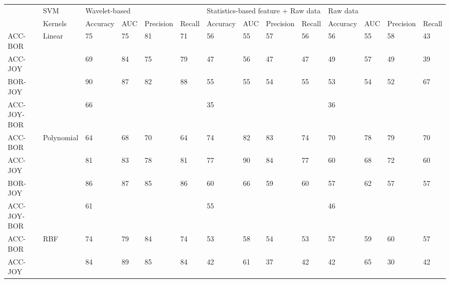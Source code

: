 \begin{sidewaystable}[]
{\begin{tabular}{llllllllllllll}
		\hline
		& SVM                            & \multicolumn{4}{l|}{Wavelet-based}   & \multicolumn{4}{l|}{Statistics-based feature + Raw data} & \multicolumn{4}{l}{Raw data}        \\ \cline{3-14} 
		& Kernels                     & Accuracy & AUC & Precision & Recall & Accuracy      & AUC      & Precision      & Recall      & Accuracy & AUC & Precision & Recall \\ \hline
		ACC-BOR     & \multirow{4}{*}{Linear}     & 75       & 75  & 81        & 71     & 56            & 55       & 57             & 56          & 56       & 55  & 58        & 43     \\
		ACC-JOY     &                             & 69       & 84  & 75        & 79     & 47            & 56       & 47             & 47          & 49       & 57  & 49        & 39     \\
		BOR-JOY     &                             & 90       & 87  & 82        & 88     & 55            & 55       & 54             & 55          & 53       & 54  & 52        & 67     \\
		ACC-JOY-BOR &                             & 66       &     &           &        & 35            &          &                &             & 36       &     &           &        \\
		ACC-BOR     & \multirow{4}{*}{Polynomial} & 64       & 68  & 70        & 64     & 74            & 82       & 83             & 74          & 70       & 78  & 79        & 70     \\
		ACC-JOY     &                             & 81       & 83  & 78        & 81     & 77            & 90       & 84             & 77          & 60       & 68  & 72        & 60     \\
		BOR-JOY     &                             & 86       & 87  & 85        & 86     & 60            & 66       & 59             & 60          & 57       & 62  & 57        & 57     \\
		ACC-JOY-BOR &                             & 61       &     &           &        & 55            &          &                &             & 46       &     &           &        \\
		ACC-BOR     & \multirow{4}{*}{RBF}        & 74       & 79  & 84        & 74     & 53            & 58       & 54             & 53          & 57       & 59  & 60        & 57     \\
		ACC-JOY     &                             & 84       & 89  & 85        & 84     & 42            & 61       & 37             & 42          & 42       & 65  & 30        & 42     \\

\end{tabular}}
\end{sidewaystable}
